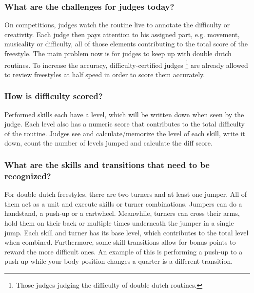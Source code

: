 \subsubsection{What are the challenges for judges today?}
\label{subsubsec:intro-bp-question-challenges-for-judges}

On competitions, judges watch the routine live to annotate the difficulty or creativity. Each judge then pays attention to his assigned part, e.g. movement, musicality or difficulty, all of those elements contributing to the total score of the freestyle. The main problem now is for judges to keep up with double dutch routines. To increase the accuracy, difficulty-certified judges \footnote{Those judges judging the difficulty of double dutch routines.} are already allowed to review freestyles at half speed in order to score them accurately.

\subsubsection{How is difficulty scored?}
\label{subsubsec:intro-bp-question-difficulty-scored}

Performed skills each have a level, which will be written down when seen by the judge. Each level also has a numeric score that contributes to the total difficulty of the routine. Judges see and calculate/memorize the level of each skill, write it down, count the number of levels jumped and calculate the diff score.

\subsubsection{What are the skills and transitions that need to be recognized?}
\label{subsubsec:intro-bp-question-what-are-the-skill}

For double dutch freestyles, there are two turners and at least one jumper. All of them act as a unit and execute skills or turner combinations. Jumpers can do a handstand, a push-up or a cartwheel. Meanwhile, turners can cross their arms, hold them on their back or multiple times underneath the jumper in a single jump. Each skill and turner has its base level, which contributes to the total level when combined. Furthermore, some skill transitions allow for bonus points to reward the more difficult ones. An example of this is performing a push-up to a push-up while your body position changes a quarter is a different transition.


